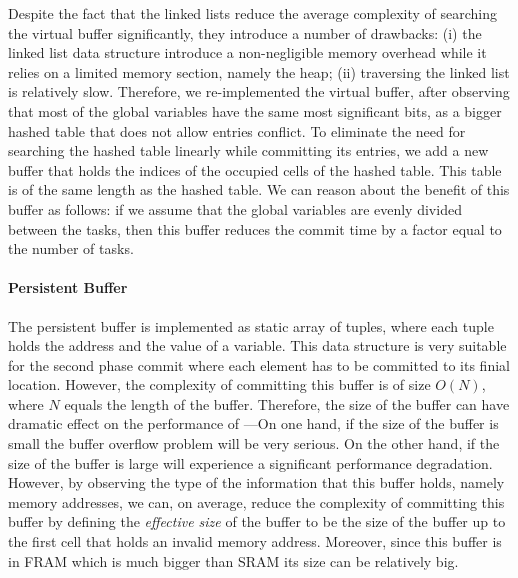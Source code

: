 Despite the fact that the linked lists reduce the average complexity of searching the virtual buffer significantly, they introduce a number of drawbacks: (i) the linked list data structure introduce a non-negligible memory overhead while it relies on a limited memory section, namely the heap; (ii) traversing the linked list is relatively slow. Therefore, we re-implemented the virtual buffer, after observing that most of the global variables have the same most significant bits, as a bigger hashed table that does not allow entries conflict. To eliminate the need for searching the hashed table linearly while committing its entries, we add a new buffer that holds the indices of the occupied cells of the hashed table. This table is of the same length as the hashed table. We can reason about the benefit of this buffer as follows: if we assume that the global variables are evenly divided between the tasks, then this buffer reduces the commit time by a factor equal to the number of tasks.   

\paragraph{Persistent Buffer}
The persistent buffer is implemented as static array of tuples, where each tuple holds  the address and the value of a variable. This data structure is very suitable for the second phase commit where each element has to be committed to its finial location. However, the complexity of committing this buffer is of size $O(N)$, where $N$ equals the length of the buffer. Therefore, the size of the buffer can have dramatic effect on the performance of \sys---On one hand, if the size of the buffer is small the buffer overflow problem will be very serious. On the other hand, if the size of the buffer is large \sys will experience a significant performance degradation. However, by observing the type of the information that this buffer holds, namely memory addresses, we can, on average, reduce the complexity of committing this buffer by defining the \emph{effective size} of the buffer to be the size of the buffer up to the first cell that holds an invalid memory address. Moreover, since this buffer is in FRAM which is much bigger than SRAM its size can be relatively big. 


